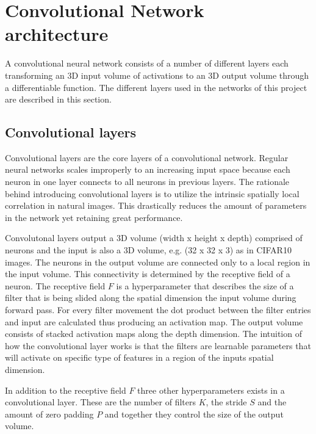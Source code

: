 \graphicspath{{Chapters/Project/}}

\section{Convolutional Network architecture} %
\label{sec:convolutional_network_architecture}

A convolutional neural network consists of a number of different layers each transforming an 3D input volume of activations to an 3D output volume through a differentiable function. The different layers used in the networks of this project are described in this section. 

\subsection{Convolutional layers} %
\label{sub:conv_layers}

Convolutional layers are the core layers of a convolutional network. Regular
neural networks scales improperly to an increasing input space because each
neuron in one layer connects to all neurons in previous layers. The rationale behind introducing convolutional layers is to utilize the intrinsic spatially local correlation in natural images. This drastically reduces the amount of parameters in the network yet retaining great performance.

Convolutonal layers output a 3D volume (width x height x depth) comprised of
neurons and the input is also a 3D volume, e.g. (32 x 32 x 3) as in CIFAR10
images. The neurons in the output volume are connected only to a local region in
the input volume. This connectivity is determined by the receptive field of a
neuron. The receptive field $F$ is a hyperparameter that describes the size of a
filter that is being slided along the spatial dimension the input volume during
forward pass. For every filter movement the dot product between the filter
entries and input are calculated thus producing an activation map. The output
volume consists of stacked activation maps along the depth dimension. The
intuition of how the convolutional layer works is that the filters are learnable
parameters that will activate on specific type of features in a region of the
inputs spatial dimension.

In addition to the receptive field $F$ three other hyperparameters exists in a convolutional layer. These are the number of filters $K$, the stride $S$ and the amount of zero padding $P$ and together they control the size of the output volume. 


